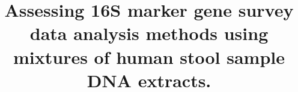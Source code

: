 \documentclass{bmcart}
\begin{document}
\begin{frontmatter}

\begin{fmbox}


\title{Assessing 16S marker gene survey data analysis methods using mixtures of human stool sample DNA extracts.}


\author[
   addressref={aff1,aff2,aff3},                   %
   corref={aff1},                       %
   email={nolson@nist.gov}   %
]{ }
\author[
   addressref={aff2,aff3},
   email={smuthiah@umiacs.umd.edu}
]{ }
\author[
   addressref={aff4},
   email={sli1@epi.umaryland.edu}
]{ }
\author[
   addressref={aff5},
   email={shao4@jhu.edu}
]{ }
\author[
   addressref={aff5},
   email={wtimp@jhu.edu}
]{ }
\author[
   addressref={aff6},
   email={msalit@stanford.edu}
]{ }
\author[
   addressref={aff4},
   email={cstine@som.umaryland.edu}
]{ }
\author[
   addressref={aff2,aff3,aff7},
   email={hcorrada@umiacs.umd.edu}
]{ }




\end{fmbox}
\end{frontmatter}
\end{document}
